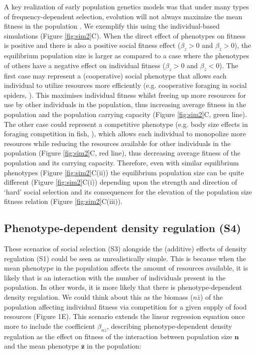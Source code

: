 \documentclass{article}
\begin{document}
A key realization of early population genetics models was that under many types of frequency-dependent selection, evolution will not always maximize the mean fitness in the population \citep{Fisher1930, Wright1948}. We exemplify this using the individual-based simulations (Figure \ref{fig:sim2}C). When the direct effect of phenotypes on fitness is positive and there is also a positive social fitness effect ($\beta_{z}>0$ and $\beta_{\bar{z}}>0$), the equilibrium population size is larger as compared to a case where the phenotypes of others have a negative effect on individual fitness ($\beta_{z}>0$ and $\beta_{\bar{z}}<0$). The first case may represent a (cooperative) social phenotype that allows each individual to utilize resources more efficiently (e.g. cooperative foraging in social spiders, \cite{Majer2018}). This maximises individual fitness whilst freeing up more resources for use by other individuals in the population, thus increasing average fitness in the population and the population carrying capacity (Figure \ref{fig:sim2}C, green line). The other case could represent a competitive phenotype (e.g. body size effects in foraging competition in fish, \cite{Ward2006}), which allows each individual to monopolize more resources while reducing the resources available for other individuals in the population (Figure \ref{fig:sim2}C, red line), thus decreasing average fitness of the population and its carrying capacity. Therefore, even with similar equilibrium phenotypes (Figure \ref{fig:sim2}C(ii)) the equilibrium population size can be quite different (Figure \ref{fig:sim2}C(i)) depending upon the strength and direction of 
`hard' social selection and its consequences for the elevation of the population size fitness relation (Figure \ref{fig:sim2}C(iii)). 

\subsection{Phenotype-dependent density regulation (S4)}
These scenarios of social selection (S3) alongside the (additive) effects of density regulation (S1) could be seen as unrealistically simple. This is because when the mean phenotype in the population affects the amount of resources available, it is likely that is an interaction with the number of individuals present in the population. In other words, it is more likely that there is phenotype-dependent density regulation. We could think about this as the biomass (${n\bar{z}}$) of the population affecting individual fitness via competition for a given supply of food resources (Figure 1E). This scenario extends the linear regression equation once more to include the coefficient $\beta_{n \bar{z}}$, describing phenotype-dependent density regulation as the effect on fitness of the interaction between population size $\bm{n}$ and the mean phenotype $\bar{\bm{z}}$ in the population: 
\end{document}
